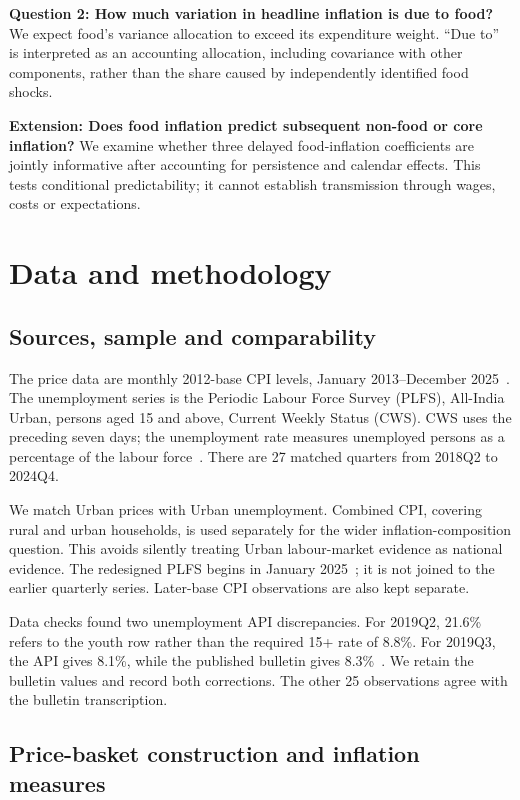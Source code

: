 \documentclass[10pt,a4paper]{article}
\begin{document}
\textbf{Question 2: How much variation in headline inflation is due to food?} We expect food's variance allocation to exceed its expenditure weight. ``Due to'' is interpreted as an accounting allocation, including covariance with other components, rather than the share caused by independently identified food shocks.

\textbf{Extension: Does food inflation predict subsequent non-food or core inflation?} We examine whether three delayed food-inflation coefficients are jointly informative after accounting for persistence and calendar effects. This tests conditional predictability; it cannot establish transmission through wages, costs or expectations.

\clearpage
\section{Data and methodology}
\subsection{Sources, sample and comparability}

The price data are monthly 2012-base CPI levels, January 2013--December 2025~\cite{cpiapi}. The unemployment series is the Periodic Labour Force Survey (PLFS), All-India Urban, persons aged 15 and above, Current Weekly Status (CWS). CWS uses the preceding seven days; the unemployment rate measures unemployed persons as a percentage of the labour force~\cite{plfs2024}. There are 27 matched quarters from 2018Q2 to 2024Q4.

We match Urban prices with Urban unemployment. Combined CPI, covering rural and urban households, is used separately for the wider inflation-composition question. This avoids silently treating Urban labour-market evidence as national evidence. The redesigned PLFS begins in January 2025~\cite{plfschange}; it is not joined to the earlier quarterly series. Later-base CPI observations are also kept separate.

Data checks found two unemployment API discrepancies. For 2019Q2, 21.6\% refers to the youth row rather than the required 15+ rate of 8.8\%. For 2019Q3, the API gives 8.1\%, while the published bulletin gives 8.3\%~\cite{plfs2019a,plfs2019b}. We retain the bulletin values and record both corrections. The other 25 observations agree with the bulletin transcription.

\subsection{Price-basket construction and inflation measures}
\end{document}
